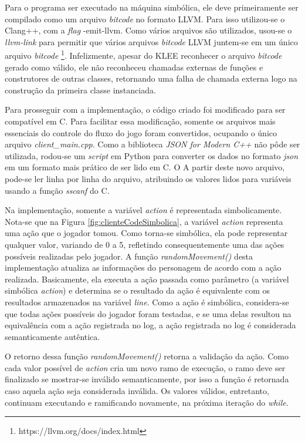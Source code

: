Para o programa ser executado na máquina simbólica, ele deve primeiramente ser compilado como um arquivo \textit{bitcode} no formato LLVM. Para isso utilizou-se o Clang++, com a \textit{flag} -emit-llvm.  Como vários arquivos são utilizados, usou-se o \textit{llvm-link} para permitir que vários arquivos \textit{bitcode} LLVM juntem-se em um único arquivo \textit{bitcode} \footnote{https://llvm.org/docs/index.html}. Infelizmente, apesar do KLEE reconhecer o arquivo \textit{bitcode} gerado como válido, ele não reconheceu chamadas externas de funções e construtores de outras classes, retornando uma falha de chamada externa logo na construção da primeira classe instanciada.

Para prosseguir com a implementação, o código criado foi modificado para ser compatível em C. Para facilitar essa modificação, somente os arquivos mais essenciais do controle do fluxo do jogo foram convertidos, ocupando o único arquivo 
\textit{client\_main.cpp}. Como a biblioteca \textit{JSON for Modern C++} não pôde ser utilizada, rodou-se um \textit{script} em Python para converter os dados no formato \textit{json} em um formato mais prático de ser lido em C. O A partir deste novo arquivo, pode-se ler linha por linha do arquivo, atribuindo os valores lidos para variáveis usando a função \textit{sscanf} do C. 

Na implementação, somente a variável \textit{action} é representada simbolicamente. Nota-se que na Figura \ref{fig:clienteCodeSimbolica}, a variável \textit{action} representa uma ação que o jogador tomou. Como torna-se simbólica, ela pode representar qualquer valor, variando de 0 a 5, refletindo consequentemente uma das ações possíveis realizadas pelo jogador. A função \textit{randomMovement()} desta implementação atualiza as informações do personagem de acordo com a ação realizada. Basicamente, ela executa a ação passada como parâmetro (a variável simbólica \textit{action}) e determina se o resultado da ação é equivalente com os resultados armazenados na variável \textit{line}. Como a ação é simbólica, considera-se que todas ações possíveis do jogador foram testadas, e se uma delas resultou na equivalência com a ação registrada no log, a ação registrada no log é considerada semanticamente autêntica.

 O retorno dessa função \textit{randomMovement()} retorna a validação da ação. Como cada valor possível de \textit{action} cria um novo ramo de execução, o ramo deve ser finalizado se mostrar-se inválido semanticamente, por isso a função é retornada caso aquela ação seja considerada inválida. Os valores válidos, entretanto, continuam executando e ramificando novamente, na próxima iteração do \textit{while}.

